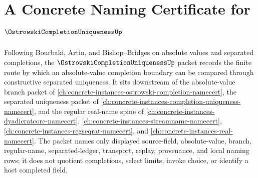\chapter{A Concrete Naming Certificate for $\OstrowskiCompletionUniquenessUp$}
\label{ch:concrete-instances-ostrowski-completion-uniqueness-namecert}

Following Bourbaki, Artin, and Bishop--Bridges on absolute values and separated completions, the $\OstrowskiCompletionUniquenessUp$ packet records the finite route by which an absolute-value completion boundary can be compared through constructive separated uniqueness. It sits downstream of the absolute-value branch packet of \autoref{ch:concrete-instances-ostrowski-completion-namecert}, the separated uniqueness packet of \autoref{ch:concrete-instances-completion-uniqueness-namecert}, and the regular real-name spine of \autoref{ch:concrete-instances-dyadicratcore-namecert}, \autoref{ch:concrete-instances-streamname-namecert}, \autoref{ch:concrete-instances-regseqrat-namecert}, and \autoref{ch:concrete-instances-real-namecert}. The packet names only displayed source-field, absolute-value, branch, regular-name, separated-ledger, transport, replay, provenance, and local naming rows; it does not quotient completions, select limits, invoke choice, or identify a host completed field.

